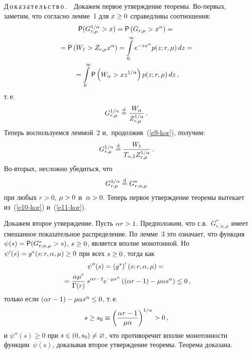 \begin{multicols}{2}
\smallskip

\noindent
Д\,о\,к\,а\,з\,а\,т\,е\,л\,ь\,с\,т\,в\,о\,.\ \ Докажем первое утверждение теоремы. 
Во-пер\-вых,
заметим, что согласно лемме~1 для $x\hm\ge0$ справедливы соотношения:
\begin{multline*}
{\sf P}(G_{r,\mu}^{1/\alpha}>x)={\sf P}\left(G_{r,\mu}>x^{\alpha}\right)={}\\
{}={\sf P}\left(W_1>Z_{r,\mu}x^{\alpha}\right)=\int\limits_{0}^{\infty}
e^{-zx^{\alpha}}p(z;r,\mu)\,dz={}
\\
{}=\int\limits_{0}^{\infty}{\sf P}\left(W_{\alpha}>xz^{1/\alpha}\right)p(z;r,\mu)\,dz\,,
\end{multline*}
т.\,е.
\begin{equation}
G_{r,\mu}^{1/\alpha}\stackrel{\mathrm{d}}{=}
\displaystyle\frac{\displaystyle W_{\alpha}\mathstrut}{\displaystyle Z_{r,\mu}^{1/\alpha}\mathstrut}\,.\label{e9-kor}
\end{equation}
Теперь воспользуемся леммой~2 и,~продолжив~(\ref{e9-kor}), получим:
\begin{equation}
G_{r,\mu}^{1/\alpha}\stackrel{\mathrm{d}}{=}
\displaystyle\frac{\displaystyle W_1\mathstrut}{\displaystyle T_{\alpha,1}Z_{r,\mu}^{1/\alpha}\mathstrut}\,.\label{e10-kor}
\end{equation}
Во-вторых, несложно убедиться, что
\begin{equation}
G_{r,\mu}^{1/\alpha}\stackrel{\mathrm{d}}{=} G^*_{r,\alpha,\mu}\label{e11-kor}
\end{equation}
при любых $r>0$, $\mu\hm>0$ и~$\alpha\hm>0$. Теперь первое утверждение
теоремы вытекает из~(\ref{e10-kor}) и~(\ref{e11-kor}).

Докажем второе утверждение. Пусть $\alpha r\hm>1$. Предположим, что 
с.в.~$G^*_{r,\alpha,\mu}$ имеет смешанное показательное распределение.
По лемме~3 это означает, что функция $\psi(s)\hm={\sf
P}(G^*_{r,\alpha,\mu}>s)$, $s\hm\ge0$, является вполне монотонной. Но
$\psi'(s)\hm=g^*(s;r,\alpha,\mu)\ge0$ при всех $s\hm\ge0$, тогда как
\begin{multline*}
\psi''(s)=\left(g^*\right)'(s;r,\alpha,\mu)={}\\
{}=\displaystyle\frac{\displaystyle \alpha\mu^r\mathstrut}{\displaystyle \Gamma(r)\mathstrut}\,s^{\alpha
r-2}e^{-\mu s^{\alpha}}\left((\alpha r-1)-\mu\alpha
s^{\alpha}\right)\le0\,,
\end{multline*}
только если $(\alpha r-1)\hm-\mu\alpha s^{\alpha}\hm\le0$, т.\,е.
$$
s\ge s_0\equiv \left(\displaystyle\frac{\displaystyle \alpha r-1\mathstrut}{\displaystyle \mu\alpha\mathstrut}\right)^{1/\alpha}>0\,,
$$
и $\psi''(s)\ge0$ при $s\hm\in(0,s_0)\hm\neq\varnothing$, что противоречит
вполне монотонности функции~$\psi(s)$, доказывая второе утверждение
теоремы. Теорема доказана.

\vspace*{-9pt}


\end{multicols}
